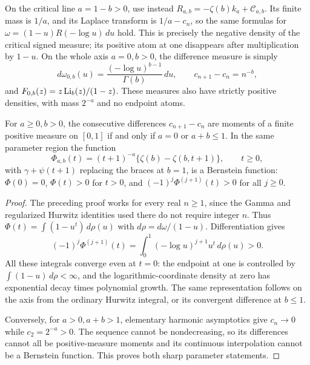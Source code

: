 On the critical line $a=1-b>0$, use instead
$R_{a,b}=-\zeta(b)k_a+\mathcal C_{a,b}$. Its finite mass is $1/a$,
and its Laplace transform is $1/a-c_n$, so the same formulas for
$\omega=(1-u)R(-\log u)\,du$ hold. This is precisely the negative
density of the critical signed measure; its positive atom at one
disappears after multiplication by $1-u$.
On the whole axis $a=0,b>0$, the difference measure is simply
\[
 d\omega_{0,b}(u)=\frac{(-\log u)^{b-1}}{\Gamma(b)}\,du,
 \qquad c_{n+1}-c_n=n^{-b},
\]
and $F_{0,b}(z)=z\operatorname{Li}_b(z)/(1-z)$. These measures also have strictly
positive densities, with mass $2^{-a}$ and no endpoint atoms.

\begin{corollary}
\label{subpick:cor:classification}
For $a\ge0,b>0$, the consecutive differences $c_{n+1}-c_n$ are
moments of a finite positive measure on $[0,1]$ if and only if
$a=0$ or $a+b\le1$. In the same parameter region the function
\[
 \Phi_{a,b}(t)=(t+1)^{-a}
       \{\zeta(b)-\zeta(b,t+1)\},\qquad t\ge0,
\]
with $\gamma+\psi(t+1)$ replacing the braces at $b=1$, is a
Bernstein function: $\Phi(0)=0$, $\Phi(t)>0$ for $t>0$, and
$(-1)^j\Phi^{(j+1)}(t)>0$ for all $j\ge0$.
\end{corollary}
\begin{proof}
The preceding proof works for every real $n\ge1$, since the Gamma
and regularized Hurwitz identities used there do not require integer
$n$. Thus $\Phi(t)=\int(1-u^t)\,d\rho(u)$ with
$d\rho=d\omega/(1-u)$. Differentiation gives
\[
 (-1)^j\Phi^{(j+1)}(t)
   =\int_0^1(-\log u)^{j+1}u^t\,d\rho(u)>0.
\]
All these integrals converge even at $t=0$: the endpoint at one is
controlled by $\int(1-u)\,d\rho<\infty$, and the logarithmic-coordinate
density at zero has exponential decay times polynomial growth.
The same representation follows on the axis from the ordinary Hurwitz
integral, or its convergent difference at $b\le1$.

Conversely, for $a>0,a+b>1$, elementary harmonic asymptotics give
$c_n\to0$ while $c_2=2^{-a}>0$. The sequence cannot be nondecreasing,
so its differences cannot all be positive-measure moments and its
continuous interpolation cannot be a Bernstein function. This proves
both sharp parameter statements.
\end{proof}

